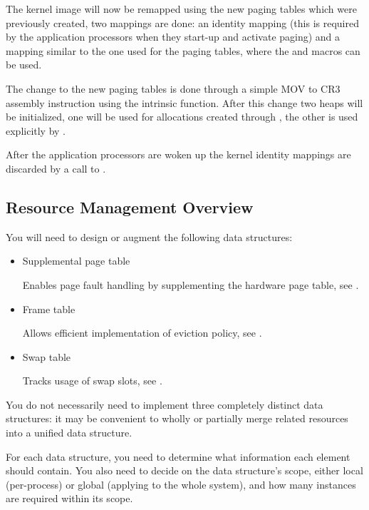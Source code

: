 The kernel image will now be remapped using the new paging tables which were previously created, two
mappings are done: an identity mapping (this is required by the application processors when they
start-up and activate paging) and a mapping similar to the one used for the paging tables, where
the  and  macros can be used.

The change to the new paging tables is done through a simple MOV to CR3 assembly instruction using
the  intrinsic function. After this change two heaps will be initialized, one
will be used for allocations created through , the other is used
explicitly by .

After the application processors are woken up the kernel identity mappings are discarded by a call
to .

\subsection{Resource Management Overview}

You will need to design or augment the following data structures:

\begin{itemize}
	\item Supplemental page table
	
		Enables page fault handling by supplementing the hardware page table, see .
		
	\item Frame table
	
		Allows efficient implementation of eviction policy, see .
		
	\item Swap table
	
		Tracks usage of swap slots,  see .
\end{itemize}

You do not necessarily need to implement three completely distinct data structures: it may be
convenient to wholly or partially merge related resources into a unified data structure.

For each data structure, you need to determine what information each element should contain. You
also need to decide on the data structure’s scope, either local (per-process) or global (applying to
the whole system), and how many instances are required within its scope.

